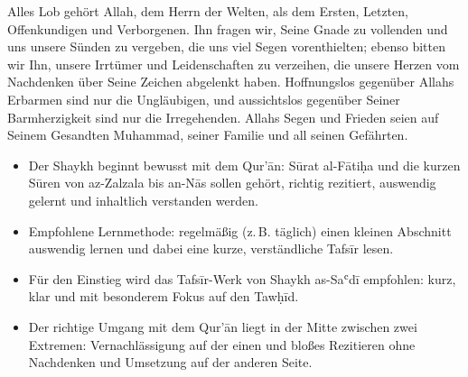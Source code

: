 \begin{merke}
Alles Lob gehört Allah, dem Herrn der Welten, als dem Ersten, Letzten, Offenkundigen und
Verborgenen. Ihn fragen wir, Seine Gnade zu vollenden und uns unsere Sünden zu vergeben, die
uns viel Segen vorenthielten; ebenso bitten wir Ihn, unsere Irrtümer und Leidenschaften zu
verzeihen, die unsere Herzen vom Nachdenken über Seine Zeichen abgelenkt haben. Hoffnungslos
gegenüber Allahs Erbarmen sind nur die Ungläubigen, und aussichtslos gegenüber Seiner
Barmherzigkeit sind nur die Irregehenden. Allahs Segen und Frieden seien auf Seinem Gesandten
Muhammad, seiner Familie und all seinen Gefährten.
\end{merke}

\begin{zusammenfassung}
\begin{itemize}[leftmargin=1.4em]
  \item Der Shaykh  beginnt bewusst mit dem Qur’ān: Sūrat al-Fātiḥa und die kurzen
        Sūren von az-Zalzala bis an-Nās sollen gehört, richtig rezitiert, auswendig gelernt und
        inhaltlich verstanden werden.
  \item Empfohlene Lernmethode: regelmäßig (z.\,B. täglich) einen kleinen Abschnitt auswendig
        lernen und dabei eine kurze, verständliche Tafsīr lesen.
  \item Für den Einstieg wird das Tafsīr-Werk von Shaykh as-Saʿdī  empfohlen: kurz,
        klar und mit besonderem Fokus auf den Tawḥīd.
  \item Der richtige Umgang mit dem Qur’ān liegt in der Mitte zwischen zwei Extremen:
        Vernachlässigung auf der einen und bloßes Rezitieren ohne Nachdenken und Umsetzung
        auf der anderen Seite.
\end{itemize}
\end{zusammenfassung}
